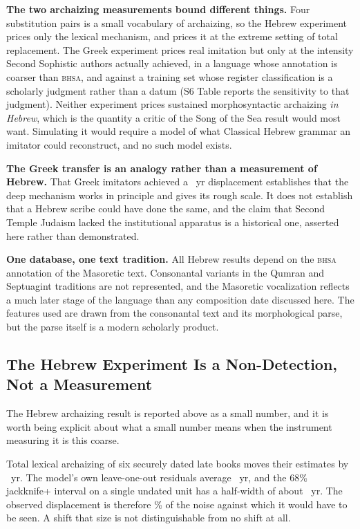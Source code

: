 \documentclass[10pt,letterpaper]{article}
\newcommand{\bhsa}{\textsc{bhsa}}
\begin{document}
\textbf{The two archaizing measurements bound different things.}  Four
substitution pairs is a small vocabulary of archaizing, so the Hebrew
experiment prices only the lexical mechanism, and prices it at the extreme
setting of total replacement.  The Greek experiment prices real imitation but
only at the intensity Second Sophistic authors actually achieved, in a
language whose annotation is coarser than \bhsa{}, and against a training set
whose register classification is a scholarly judgment rather than a datum
(S6 Table reports the sensitivity to that judgment).  Neither experiment
prices sustained morphosyntactic archaizing \emph{in Hebrew}, which is the
quantity a critic of the Song of the Sea result would most want.  Simulating it
would require a model of what Classical Hebrew grammar an imitator could
reconstruct, and no such model exists.

\textbf{The Greek transfer is an analogy rather than a measurement of Hebrew.}
That Greek imitators achieved a \GKattshiftAbs~yr displacement establishes that the
deep mechanism works in principle and gives its rough scale.  It does not
establish that a Hebrew scribe could have done the same, and the claim that
Second Temple Judaism lacked the institutional apparatus is a historical one,
asserted here rather than demonstrated.

\textbf{One database, one text tradition.}  All Hebrew results depend on the
\bhsa{} annotation of the Masoretic text.  Consonantal variants in the
Qumran and Septuagint traditions are not represented, and the Masoretic
vocalization reflects a much later stage of the language than any composition
date discussed here.  The features used are drawn from the consonantal text
and its morphological parse, but the parse itself is a modern scholarly
product.

\subsection*{The Hebrew Experiment Is a Non-Detection, Not a Measurement}

The Hebrew archaizing result is reported above as a small number, and it is
worth being explicit about what a small number means when the instrument
measuring it is this coarse.

Total lexical archaizing of six securely dated late books moves their estimates
by \arcMeanAbs~yr.  The model's own leave-one-out residuals average
\DETresid~yr, and the 68\% jackknife+ interval on a single undated unit has a
half-width of about \DEThalf~yr.  The observed displacement is therefore
\DETpct\% of the noise against which it would have to be seen.  A shift that
size is not distinguishable from no shift at all.
\end{document}
